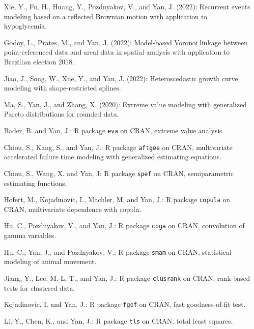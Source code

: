 \documentclass[Statistics]{vita}
\begin{document}
\begin{vita}
\begin{Publications}
\begin{UnderReview}
  \item *Xie, Y., Fu, H., Huang, Y., Pozdnyakov, V., and Yan, J. (2022): Recurrent events modeling based on a reflected Brownian motion with application to hypoglycemia.
  \item *Godoy, L., Prates, M., and Yan, J. (2022): Model-based Voronoi linkage between point-referenced data and areal data in spatial analysis with application to Brazilian election 2018.
  \item *Jiao, J., Song, W., Xue, Y., and Yan, J. (2022): Heteroscedastic growth curve modeling with shape-restricted splines.
  \item *Ma, S., Yan, J., and Zhang, X. (2020): Extreme value modeling with generalized Pareto distributions for rounded data.
  \end{UnderReview}
  \begin{Software}
  \item *Bader, B. and Yan, J.: R package \texttt{eva} on CRAN, extreme value analysis.
  \item *Chiou, S., Kang, S., and Yan, J.: R package \texttt{aftgee} on CRAN, multivariate accelerated failure time modeling with generalized estimating equations.
  \item *Chiou, S., Wang, X. and Yan, J: R package \texttt{spef} on CRAN, semiparametric estimating functions.
  \item Hofert, M., Kojadinovic, I.,  M\"achler, M. and Yan, J.: R package \texttt{copula} on CRAN, multivariate dependence with copula.
  \item *Hu, C., Pozdnyakov, V., and Yan, J.: R package \texttt{coga} on CRAN, convolution of gamma variables.
  \item *Hu, C., Yan, J., and Pozdnyakov, V.: R package \texttt{smam} on CRAN, statistical modeling of animal movement. 
  \item *Jiang, Y., Lee, M.-L. T., and Yan, J.: R package \texttt{clusrank} on CRAN, rank-based tests for clustered data.
  \item Kojadinovic, I. and Yan, J.: R package \texttt{fgof} on CRAN, fast goodness-of-fit test.
  \item *Li, Y., Chen, K., and Yan, J.: R package \texttt{tls} on CRAN, total least squares.

\end{Software}
\end{Publications}
\end{vita}
\end{document}
